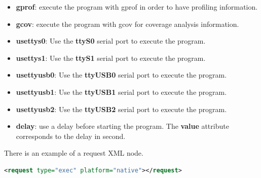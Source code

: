 \documentclass[11pt]{book}
\begin{document}
\begin{itemize}
            \begin{itemize}
               \item
                  \textbf{gprof}: execute the program with gprof in order to
                  have profiling information.
               \item
                  \textbf{gcov}: execute the program with gcov for coverage
                  analysis information.
               \item
                  \textbf{usettys0}: Use the \textbf{ttyS0} serial port to execute
                  the program.
               \item
                  \textbf{usettys1}: Use the \textbf{ttyS1} serial port to execute
                  the program.
               \item
                  \textbf{usettyusb0}: Use the \textbf{ttyUSB0} serial port to execute
                  the program.
               \item
                  \textbf{usettyusb1}: Use the \textbf{ttyUSB1} serial port to execute
                  the program.
               \item
                  \textbf{usettyusb2}: Use the \textbf{ttyUSB2} serial port to execute
                  the program.
               \item
                  \textbf{delay}: use a delay before starting the program. The
                  \textbf{value} attribute corresponds to the delay in second.
            \end{itemize}

            There is an example of a request XML node.
      \begin{lstlisting}[language=xml]
<request type="exec" platform="native"></request>
      \end{lstlisting}
      \end{itemize}
\end{document}
